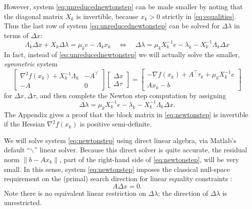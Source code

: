 \documentclass[11pt]{article}
\newcommand{\grad}{\nabla}
\begin{document}
However, system \eqref{eq:unreducednewtonstep} can be made smaller by noting that the diagonal matrix $X_k$ is invertible, because $x_k>0$ strictly in \eqref{eq:equalities}.  Thus the last row of system \eqref{eq:unreducednewtonstep} can be solved for $\Delta\lambda$ in terms of $\Delta x$:
\begin{equation}
\Lambda_k\Delta x + X_k\Delta \lambda = \mu_k e - \Lambda_k x_k \quad \iff \quad
\Delta\lambda = \mu_k X_k^{-1} e - \lambda_k - X_k^{-1} \Lambda_k \Delta x \label{eq:solvefordlam}
\end{equation}
In fact, instead of \eqref{eq:unreducednewtonstep} we will actually solve the smaller, \emph{symmetric} system
\begin{equation}
\begin{bmatrix}
\grad^2 f(x_k) + X_k^{-1}\Lambda_k & -A^\top \\
-A             & 0
\end{bmatrix}
\begin{bmatrix}
\Delta x \\
\Delta \tau
\end{bmatrix}
=
\begin{bmatrix}
-\grad f(x_k) + A^\top \tau_k + \mu_k X_k^{-1} e \\
A x_k - b
\end{bmatrix} \label{eq:newtonstep}
\end{equation}
for $\Delta x,\Delta\tau$, and then complete the Newton step computation by assigning
\begin{equation}
\Delta\lambda = \mu_k X_k^{-1} e - \lambda_k - X_k^{-1} \Lambda_k \Delta x. \label{eq:newtonsteplam}
\end{equation}
The Appendix gives a proof that the block matrix in \eqref{eq:newtonstep} is invertible if the Hessian $\grad^2 f(x_k)$ is positive semi-definite.

We will solve system \eqref{eq:newtonstep} using direct linear algebra, via Matlab's default ``$\backslash$'' linear solver.  Because this direct solver is quite accurate, the residual norm $\|b-A x_k\|$, part of the right-hand side of \eqref{eq:newtonstep}, will be very small.  In this sense, system \eqref{eq:newtonstep} imposes the classical null-space requirement on the (primal) search direction for linear equality constraints \cite[chapter 3]{GrivaNashSofer2009}:
\begin{equation}
A \Delta x = 0.  \label{eq:dxnull}
\end{equation}
Note there is no equivalent linear restriction on $\Delta\lambda$; the direction of $\Delta\lambda$ is unrestricted.
\end{document}
